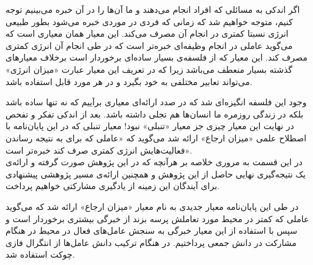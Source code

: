 اگر اندکی به مسائلی که افراد انجام می‌دهند و ما آن‌ها را در آن خبره می‌بینیم توجه کنیم، متوجه خواهیم شد که زمانی که فردی در موردی خبره می‌شود بطور طبیعی انرژی نسبتا کمتری در انجام آن مصرف می‌کند. این معیار همان معیاری است که می‌گوید عاملی در انجام وظیفه‌ای خبره‌تر است که در طی انجام آن انرژی کمتری مصرف کند. این معیار که از فلسفه‌ی بسیار ساده‌ای برخوردار است برخلاف معیار‌های گذشته بسیار منعطف می‌باشد زیرا که در تعریف این معیار عبارت «میزان انرژی» می‌تواند تعابیر مختلفی به خود بگیرد و در هر مورد قابل استفاده باشد.

وجود این فلسفه انگیزه‌ای شد که در صدد ارائه‌ای معیاری برآییم که نه تنها ساده باشد بلکه در زندگی روزمره ما انسان‌ها هم تجلی داشته باشد. بعد از اندکی تفکر و تفحص در نهایت این معیار چیزی جز معیار «تنبلی» نبود! معیار تنبلی که در این پایان‌نامه با اصطلاح علمی «میزان ارجاع» ارائه شد می‌گوید که «عاملی که برای به نتیجه رساندن فعالیت‌هایش انرژی کمتری صرف کند خبره‌تر است».\\
در این قسمت به مروری خلاصه بر هرآنچه که در این پژوهش صورت گرفته و ارائه‌ی یک نتیجه‌گیری نهایی حاصل از این پژوهش و همچنین ارائه‌ی مسیر پژوهشی پیشنهادی برای آیندگان این زمینه از یادگیری مشارکتی خواهیم پرداخت.

در طی این پایان‌نامه معیار جدیدی به نام معیار «میزان ارجاع» ارائه شد که می‌گوید عاملی که کمتر در محیط مورد تعاملش پرسه بزند از خبرگی بیشتری برخوردار است و سپس با استفاده از این معیار خبرگی به سنجش عامل‌های فعال در محیط در هنگام مشارکت در دانش جمعی پرداختیم. در هنگام ترکیب دانش عامل‌ها از انتگرال فازی چوکت استفاده شد.

